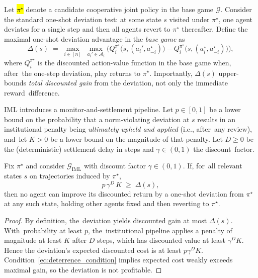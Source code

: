 \documentclass[mca,article,accept,pdftex,oneauthor]{Definitions/mdpi}
\begin{document}
Let \hl{$\pi^\star$} %
 denote a candidate cooperative joint policy in the base game $\mathcal{G}$. Consider the standard one-shot deviation test: at some state $s$ visited under $\pi^\star$, one agent deviates for a single step and then all agents revert to $\pi^\star$ thereafter. Define the maximal one-shot deviation advantage in the \emph{base game} as
\begin{equation}
\label{eq:delta_def}
\Delta(s)\;=\;\max_{i\in[n]}\;\max_{a_i'\in\mathcal{A}_i}
\Big(
Q_i^{\pi^\star}\!\big(s,(a_i',a_{-i}^\star)\big)
-
Q_i^{\pi^\star}\!\big(s,(a_i^\star,a_{-i}^\star)\big)
\Big),
\end{equation}
where $Q_i^{\pi^\star}$ is the discounted action-value function in the base game when, after~the one-step deviation, play returns to $\pi^\star$. Importantly, $\Delta(s)$ upper-bounds \emph{total discounted gain} from the deviation, not only the immediate reward~difference.

IML introduces a monitor-and-settlement pipeline. Let $p\in[0,1]$ be a lower bound on the probability that a norm-violating deviation at $s$ results in an institutional penalty being \emph{ultimately upheld and applied} (i.e., after~any review), and~let $K>0$ be a lower bound on the magnitude of that penalty. Let $D\ge 0$ be the (deterministic) settlement delay in steps and $\gamma\in(0,1)$ the discount~factor.

\begin{Proposition}
\label{prop:oneshot_deterrence}
Fix $\pi^\star$ and consider $\mathcal{G}_{\text{IML}}$ with discount factor $\gamma\in(0,1)$.
If, for~all relevant states $s$ on trajectories induced by $\pi^\star$,
\begin{equation}
\label{eq:deterrence_condition}
p\,\gamma^{D}\,K \;\ge\; \Delta(s),
\end{equation}
then no agent can improve its discounted return by a one-shot deviation from $\pi^\star$ at any such state, holding other agents fixed and then reverting to $\pi^\star$.
\end{Proposition}

\begin{proof}
By definition, the~deviation yields discounted gain at most $\Delta(s)$. With~probability at least $p$, the~institutional pipeline applies a penalty of magnitude at least $K$ after $D$ steps, which has discounted value at least $\gamma^{D}K$. Hence the deviation’s expected discounted cost is at least $p\gamma^{D}K$. Condition~\eqref{eq:deterrence_condition} implies expected cost weakly exceeds maximal gain, so the deviation is not profitable.
\end{proof}
\end{document}
